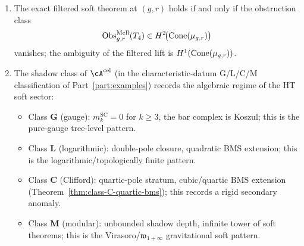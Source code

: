 \begin{theorem}
\begin{enumerate}[label=\textup{(\roman*)}]
\begin{itemize}
\item $r=2$: leading Weinberg soft theorem from $\Theta^{(0)}$ at
 shadow depth~$1$.
\item $r=3$: sub-leading Cachazo--Strominger soft theorem from
 $\Theta^{(0)}$ at shadow depth~$2$.
\item $r\geq 4$: sub${}^{r-2}$-leading Hamada--Shiu--Li--Strominger
 soft theorem from $\Theta^{(0)}$ at shadow depth~$r-1$
 (Theorem~\ref{thm:higher-soft-shadow}).
\end{itemize}
\item The exact filtered soft theorem
at $(g,r)$ holds if and only if the obstruction class
\[
\operatorname{Obs}^{\mathrm{Mell}}_{g,r}(T_4)
\in
H^2\!\bigl(\operatorname{Cone}(\mu_{g,r})\bigr)
\]
vanishes; the ambiguity of the filtered lift is
$H^1(\operatorname{Cone}(\mu_{g,r}))$.
\item The shadow class of $\cA^{\mathrm{cel}}$ (in the characteristic-datum
G/L/C/M classification of Part~\ref{part:examples}) records the algebraic regime of the
HT soft sector:
\begin{itemize}
\item Class $\mathbf G$ (gauge): $m_k^{\mathrm{SC}}=0$ for $k\geq 3$, the
 bar complex is Koszul; this is the pure-gauge tree-level pattern.
\item Class $\mathbf L$ (logarithmic): double-pole closure, quadratic
 BMS extension; this is the logarithmic/topologically finite pattern.
\item Class $\mathbf C$ (Clifford): quartic-pole stratum, cubic/quartic
 BMS extension (Theorem~\ref{thm:class-C-quartic-bms}); this records
 a rigid secondary anomaly.
\item Class $\mathbf M$ (modular): unbounded shadow depth, infinite
 tower of soft theorems; this is the Virasoro/\(\mathfrak{w}_{1+\infty}\)
 gravitational soft pattern.
\end{itemize}
\end{enumerate}
\end{theorem}


